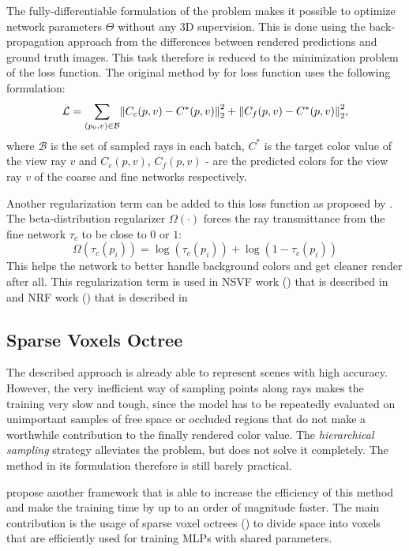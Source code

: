 The fully-differentiable formulation of the problem makes it possible
to optimize network parameters $\Theta$ without any 3D supervision.
This is done using the back-propagation approach from the differences
between rendered predictions and ground truth images.
This task therefore is reduced to the minimization problem of the loss function.
The original method by \cite{mildenhall2020nerf} for loss function uses the following formulation:
\begin{equation}
    \label{eq:loss_func}
    \mathcal{L} = \sum_{(p_0, v) \in \mathcal{B}} \norm{ C_c(p, v) - C^*(p, v) }^2_2 + \norm{ C_f(p, v) - C^*(p, v) }^2_2,
\end{equation}
where $\mathcal{B}$ is the set of sampled rays in each batch,
$C^*$ is the target color value of the view ray $v$ and
$C_c(p, v)$, $C_f(p, v)$ - are the predicted colors for the view ray $v$ of the coarse and fine networks respectively.

Another regularization term can be added to this loss function as proposed by \cite{Lombardi_2019}.
The beta-distribution regularizer $\Omega(\cdot)$
forces the ray transmittance from the fine network $\tau_c$ to be close to $0$ or $1$:
\begin{equation}
    \label{eq:beta_regularizer}
    \Omega(\tau_c(p_i)) = \log(\tau_c(p_i)) + \log(1 - \tau_c(p_i))
\end{equation}
This helps the network to better handle background colors and get cleaner render after all.
This regularization term is used in NSVF work (\cite{liu2021neural})
that is described in 
and NRF work (\cite{bi2020neural}) that is described in 



\subsection{Sparse Voxels Octree}
\label{subsec:NSVF}
The described approach is already able to represent scenes with high accuracy.
However, the very inefficient way of sampling points along rays
makes the training very slow and tough,
since the model has to be repeatedly evaluated on unimportant samples
of free space or occluded regions that do not make a worthwhile contribution to the finally rendered color value.
The \textit{hierarchical sampling} strategy alleviates the problem,
but does not solve it completely.
The method in its formulation therefore is still barely practical.


\cite{liu2021neural} propose another framework
that is able to increase the efficiency of this method
and make the training time by up to an order of magnitude faster.
The main contribution is the usage of sparse voxel octrees (\cite{laine2011EfficientSV}) to divide space into voxels
that are efficiently used for training MLPs with shared parameters.

